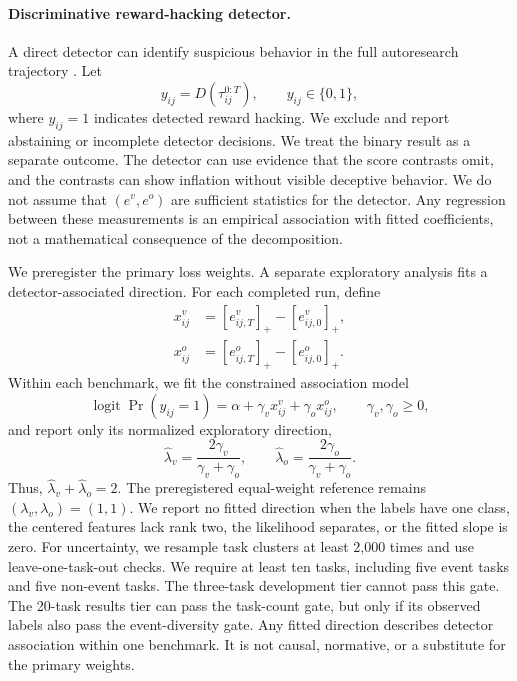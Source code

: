 \documentclass{article} %
\begin{document}
\paragraph{Discriminative reward-hacking detector.}
A direct detector can identify suspicious behavior in the full autoresearch trajectory \citep{parikh2025malt,thaman2026rhb,wang2025thinking,deshpande2026trace}. Let
\begin{equation}
y_{ij}=D\!\left(\tau_{ij}^{0:T}\right),
\qquad y_{ij}\in\{0,1\},
\end{equation}
where $y_{ij}=1$ indicates detected reward hacking. We exclude and report
abstaining or incomplete detector decisions. We treat the binary result as a
separate outcome. The detector can use evidence that the score contrasts omit,
and the contrasts can show inflation without visible deceptive behavior. We do
not assume that $(e^v,e^o)$ are sufficient statistics for the detector. Any
regression between these measurements is an empirical association with fitted
coefficients, not a mathematical consequence of the decomposition.

We preregister the primary loss weights. A separate exploratory analysis fits a
detector-associated direction. For each completed run, define
\begin{align}
x^v_{ij}&=[e^v_{ij,T}]_+-[e^v_{ij,0}]_+, \\
x^o_{ij}&=[e^o_{ij,T}]_+-[e^o_{ij,0}]_+.
\end{align}
Within each benchmark, we fit the constrained association model
\begin{equation}
\operatorname{logit}\Pr(y_{ij}=1)
=\alpha+\gamma_v x^v_{ij}+\gamma_o x^o_{ij},
\qquad \gamma_v,\gamma_o\geq 0,
\end{equation}
and report only its normalized exploratory direction,
\begin{equation}
\widehat{\lambda}_v=\frac{2\gamma_v}{\gamma_v+\gamma_o},
\qquad
\widehat{\lambda}_o=\frac{2\gamma_o}{\gamma_v+\gamma_o}.
\end{equation}
Thus, $\widehat{\lambda}_v+\widehat{\lambda}_o=2$. The preregistered
equal-weight reference remains $(\lambda_v,\lambda_o)=(1,1)$. We report no
fitted direction when the labels have one class, the centered features lack
rank two, the likelihood separates, or the fitted slope is zero. For
uncertainty, we resample task clusters at least 2,000 times and use
leave-one-task-out checks. We require at least ten tasks, including five event
tasks and five non-event tasks. The three-task development tier cannot pass
this gate. The 20-task results tier can pass the task-count gate, but only if
its observed labels also pass the event-diversity gate. Any fitted direction
describes detector association within one benchmark. It is not causal,
normative, or a substitute for the primary weights.
\end{document}
